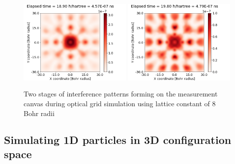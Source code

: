 \begin{figure}
	\begin{center}
		\includegraphics[width=0.49\textwidth]{figures/optical_grid_interference_01_8_grid.png}
		\includegraphics[width=0.49\textwidth]{figures/optical_grid_interference_02_8_grid.png}
		\caption{Two stages of interference patterns forming on the measurement canvas during optical grid simulation using lattice constant of $8$ Bohr radii}
		\label{fig:optical_grid_interference_8_grid}
	\end{center}	
\end{figure}

\subsection{Simulating 1D particles in 3D configuration space}

